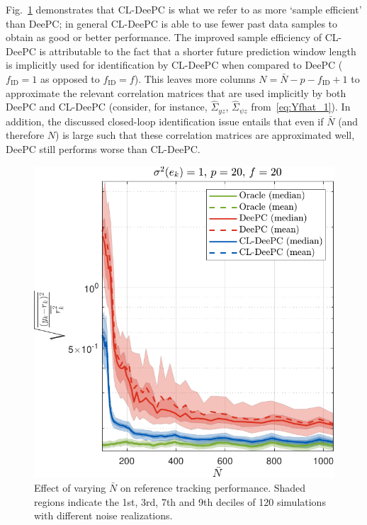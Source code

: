 Fig.~\ref{fig:varying_Nbar} demonstrates that \ac{CL-DeePC} is what we refer to as more `sample efficient' than \ac{DeePC}; in general \ac{CL-DeePC} is able to use fewer past data samples to obtain as good or better performance. The improved sample efficiency of \ac{CL-DeePC} is attributable to the fact that a shorter future prediction window length is implicitly used for identification by \ac{CL-DeePC} when compared to \ac{DeePC} ($f_\mathrm{ID}=1$ as opposed to $f_\mathrm{ID}=f$). This leaves more columns $N=\bar{N}-p-f_\mathrm{ID}+1$ to approximate the relevant correlation matrices that are used implicitly by both \ac{DeePC} and \ac{CL-DeePC} (consider, for instance, $\hat{\Sigma}_{yz}$, $\hat{\Sigma}_{\psi z}$ from~\eqref{eq:Yfhat_1}). In addition, the discussed closed-loop identification issue entails that even if $\bar{N}$ (and therefore $N$) is large such that these correlation matrices are approximated well, \ac{DeePC} still performs worse than \ac{CL-DeePC}.
\begin{figure}[t!]
\begin{center}
\includegraphics[width=\columnwidth]{results/figures/Varying_Nbar_99-1039-50_p_20_f_20_Re_1_Ru_1_Rdu_0_Q_100_R_0_dR_10.pdf}    %
\caption{Effect of varying $\bar{N}$ on reference tracking performance. Shaded regions indicate the 1st, 3rd, 7th and 9th deciles of 120 simulations with different noise realizations.}  %
\label{fig:varying_Nbar}                                 %
\end{center}                                 %
\end{figure}

